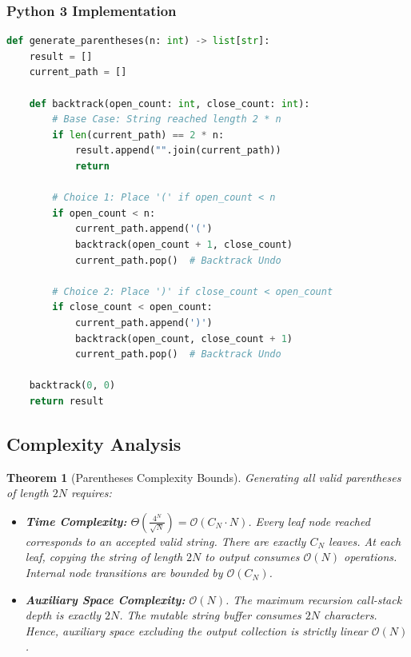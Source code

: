 \documentclass[10pt,journal,compsoc,onecolumn]{IEEEtran}
\newtheorem{theorem}{Theorem}
\begin{document}
\subsubsection{Python 3 Implementation}
\begin{lstlisting}[language=Python, caption={Production Python Implementation with StringBuilder List}]
def generate_parentheses(n: int) -> list[str]:
    result = []
    current_path = []

    def backtrack(open_count: int, close_count: int):
        # Base Case: String reached length 2 * n
        if len(current_path) == 2 * n:
            result.append("".join(current_path))
            return

        # Choice 1: Place '(' if open_count < n
        if open_count < n:
            current_path.append('(')
            backtrack(open_count + 1, close_count)
            current_path.pop()  # Backtrack Undo

        # Choice 2: Place ')' if close_count < open_count
        if close_count < open_count:
            current_path.append(')')
            backtrack(open_count, close_count + 1)
            current_path.pop()  # Backtrack Undo

    backtrack(0, 0)
    return result
\end{lstlisting}

\subsection{Complexity Analysis}
\begin{theorem}[Parentheses Complexity Bounds]
Generating all valid parentheses of length $2N$ requires:
\begin{itemize}
    \item \textbf{Time Complexity:} $\Theta\left(\frac{4^N}{\sqrt{N}}\right) = \mathcal{O}(C_N \cdot N)$. Every leaf node reached corresponds to an accepted valid string. There are exactly $C_N$ leaves. At each leaf, copying the string of length $2N$ to output consumes $\mathcal{O}(N)$ operations. Internal node transitions are bounded by $\mathcal{O}(C_N)$.
    \item \textbf{Auxiliary Space Complexity:} $\mathcal{O}(N)$. The maximum recursion call-stack depth is exactly $2N$. The mutable string buffer consumes $2N$ characters. Hence, auxiliary space excluding the output collection is strictly linear $\mathcal{O}(N)$.
\end{itemize}
\end{theorem}
\end{document}
